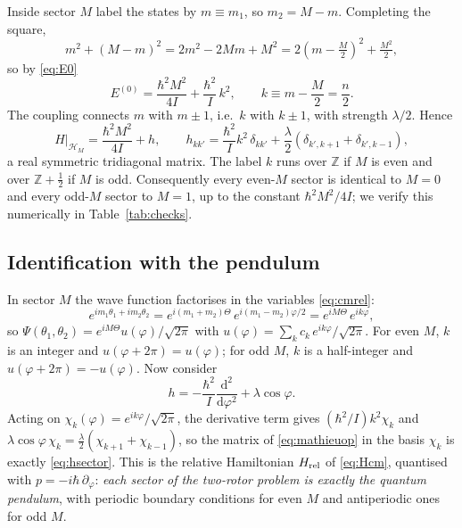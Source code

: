 \documentclass[preprint,12pt]{elsarticle}
\newcommand{\dd}{\mathrm{d}}
\begin{document}
Inside sector $M$ label the states by $m\equiv m_{1}$, so $m_{2}=M-m$. Completing
the square,
\begin{equation}
m^{2}+(M-m)^{2}=2m^{2}-2Mm+M^{2}=2\left(m-\tfrac{M}{2}\right)^{2}+\tfrac{M^{2}}{2},
\end{equation}
so by \eqref{eq:E0}
\begin{equation}
E^{(0)}=\frac{\hbar^{2}M^{2}}{4I}+\frac{\hbar^{2}}{I}\,k^{2},
\qquad k\equiv m-\frac{M}{2}=\frac{n}{2}.
\end{equation}
The coupling connects $m$ with $m\pm1$, i.e.\ $k$ with $k\pm1$, with strength
$\lambda/2$. Hence
\begin{equation}
H\big|_{\mathcal{H}_{M}}=\frac{\hbar^{2}M^{2}}{4I}+h,\qquad
h_{kk'}=\frac{\hbar^{2}}{I}k^{2}\,\delta_{kk'}
+\frac{\lambda}{2}\left(\delta_{k',k+1}+\delta_{k',k-1}\right),
\label{eq:hsector}
\end{equation}
a real symmetric tridiagonal matrix. The label $k$ runs over $\mathbb{Z}$ if $M$
is even and over $\mathbb{Z}+\tfrac12$ if $M$ is odd. Consequently every
even-$M$ sector is identical to $M=0$ and every odd-$M$ sector to $M=1$, up to
the constant $\hbar^{2}M^{2}/4I$; we verify this numerically in
Table~\ref{tab:checks}.

\subsection{Identification with the pendulum}

In sector $M$ the wave function factorises in the variables \eqref{eq:cmrel}:
\begin{equation}
e^{im_{1}\theta_{1}+im_{2}\theta_{2}}
=e^{i(m_{1}+m_{2})\Theta}\,e^{i(m_{1}-m_{2})\varphi/2}
=e^{iM\Theta}\,e^{ik\varphi},
\end{equation}
so $\Psi(\theta_{1},\theta_{2})=e^{iM\Theta}u(\varphi)/\sqrt{2\pi}$ with
$u(\varphi)=\sum_{k}c_{k}\,e^{ik\varphi}/\sqrt{2\pi}$. For even $M$, $k$ is an
integer and $u(\varphi+2\pi)=u(\varphi)$; for odd $M$, $k$ is a half-integer and
$u(\varphi+2\pi)=-u(\varphi)$. Now consider
\begin{equation}
h=-\frac{\hbar^{2}}{I}\frac{\dd^{2}}{\dd\varphi^{2}}+\lambda\cos\varphi .
\label{eq:mathieuop}
\end{equation}
Acting on $\chi_{k}(\varphi)=e^{ik\varphi}/\sqrt{2\pi}$, the derivative term
gives $(\hbar^{2}/I)k^{2}\chi_{k}$ and
$\lambda\cos\varphi\,\chi_{k}=\tfrac{\lambda}{2}(\chi_{k+1}+\chi_{k-1})$, so the
matrix of \eqref{eq:mathieuop} in the basis $\chi_{k}$ is exactly
\eqref{eq:hsector}. This is the relative Hamiltonian $H_{\rm rel}$ of
\eqref{eq:Hcm}, quantised with $p=-i\hbar\,\partial_{\varphi}$: \emph{each sector
of the two-rotor problem is exactly the quantum pendulum}, with periodic
boundary conditions for even $M$ and antiperiodic ones for odd $M$.
\end{document}
